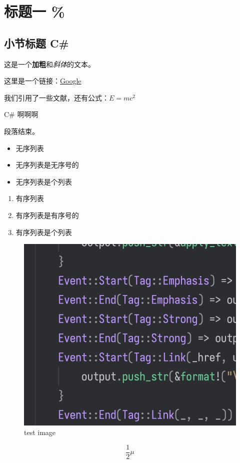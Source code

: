 \chapter{标题一 {\%}}
\section{小节标题 C\#}
这是一个\textbf{加粗}和\textit{斜体}的文本。

这里是一个链接：\href{https://www.google.com}{Google}

我们引用了一些文献\cite{foo}，还有公式：$E = mc^2$

C\# 啊啊啊

段落结束。

\begin{itemize}
\item 无序列表
\item 无序列表是无序号的
\item 无序列表是个列表
\end{itemize}
\begin{enumerate}
\item 有序列表
\item 有序列表是有序号的
\item 有序列表是个列表
\end{enumerate}
\begin{figure}[h]
\includegraphics{images/test.jpg}
\caption{test image}
\label{fig:images/test.jpg}
\end{figure}


\begin{equation}
\frac{1}{2}\mu
\label{eq:hhhhh}
\end{equation}

